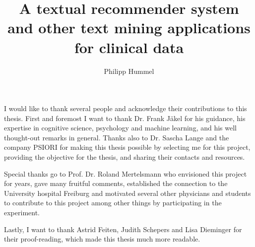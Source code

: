 \documentclass[11pt, twoside, openright, utf8, bachelor, english, subfiles]{base/thesis}
\institute{Institute of Cognitive Science}
\title{A textual recommender system and other text mining applications for clinical data}
\author{Philipp Hummel}
\begin{document}
\maketitle

\begin{abstract}

\end{abstract}

\begin{acknowledgements}
I would like to thank several people and acknowledge their contributions to this thesis. First and foremost I want to thank Dr. Frank Jäkel for his guidance, his expertise in cognitive science, psychology and machine learning, and his well thought-out remarks in general. Thanks also to Dr. Sascha Lange and the company PSIORI for making this thesis possible by selecting me for this project, providing the objective for the thesis, and sharing their contacts and resources.

Special thanks go to Prof. Dr. Roland Mertelsmann who envisioned this project for years, gave many fruitful comments, established the connection to the University hospital Freiburg and motivated several other physicians and students to contribute to this project among other things by participating in the experiment.

Lastly, I want to thank Astrid Feiten, Judith Schepers and Lisa Dieminger for their proof-reading, which made this thesis much more readable.
\end{acknowledgements}

\tableofcontents

\mainpart






%
%
%
%

\appendix






\declaration
\end{document}
